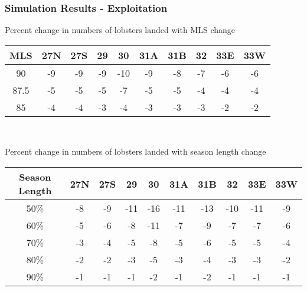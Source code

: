 \documentclass{beamer}
\begin{document}
\begin{frame}
\frametitle{Simulation Results - Exploitation}
Percent change in numbers of lobsters landed with MLS change 
\centering
\begin{tabular}{|c|c|c|c|c|c|c|c|c|c|}
\hline
MLS & 27N & 27S & 29 & 30 & 31A & 31B & 32 & 33E & 33W \\
\hline
90 & -9 & -9 & -9 & -10 & -9 & -8 & -7 & -6 & -6 \\
\hline
87.5 & -5 & -5 & -5 & -7  & -5 & -5 & -4 & -4 & -4 \\
\hline
85 & -4 & -4 & -3 & -4  & -3 & -3 & -3 & -2 & -2 \\
\hline
 
\end{tabular}\\
\vspace{5mm}

Percent change in numbers of lobsters landed with season length change 
\centering
\begin{tabular}{|c|c|c|c|c|c|c|c|c|c|}
\hline
Season Length & 27N & 27S & 29 & 30 & 31A & 31B & 32 & 33E & 33W \\
\hline
50\%   & -8 & -9 & -11 & -16 & -11 & -13 & -10 & -11 & -9 \\
\hline
60\%   & -5 & -6 & -8 & -11 & -7 & -9 & -7 & -7 & -6 \\
\hline
70\%   & -3 & -4 & -5 & -8 & -5 & -6 & -5 & -5 & -4 \\
\hline
80\%   & -2 & -2 & -3 & -5 & -3 & -4 & -3 & -3 & -2 \\
\hline
90\%   & -1 & -1 & -1 & -2 & -1 & -2 & -1 & -1 & -1 \\
\hline
 
\end{tabular}
\end{frame}
\end{document}
